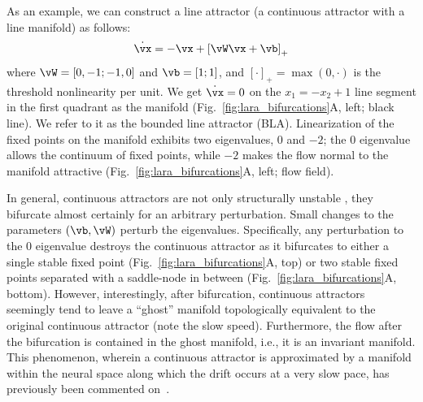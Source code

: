 \documentclass{article} %
\newcounter{ct}
\newcommand{\reals}{\mathbb{R}}
\theoremstyle{definition}
\theoremstyle{remark}
\begin{document}
As an example, we can construct a line attractor (a continuous attractor with a line manifold) as follows:
\begin{align}\label{eq:TLN}
    \dot{\vx} = -\vx + \left[ \vW \vx + \vb \right]_{+}
\end{align}
where \(\vW = [0, -1; -1, 0]\) and \(\vb = [1; 1]\), and \([\cdot]_{+} = \max(0,\cdot)\) is the threshold nonlinearity per unit.
We get \(\dot{\vx} = 0\) on the \(x_1 = -x_2 + 1\) line segment in the first quadrant as the manifold (Fig.~\ref{fig:lara_bifurcations}A, left; black line).
We refer to it as the bounded line attractor (BLA).
Linearization of the fixed points on the manifold exhibits two eigenvalues, \(0\) and \(-2\);
the \(0\) eigenvalue allows the continuum of fixed points, while \(-2\) makes the flow normal to the manifold attractive (Fig.~\ref{fig:lara_bifurcations}A, left; flow field).

In general, continuous attractors are not only structurally unstable \citep{mane1987proof}, they bifurcate almost certainly for an arbitrary perturbation.
Small changes to the parameters \((\vb,\vW)\) perturb the eigenvalues.
Specifically, any perturbation to the \(0\) eigenvalue destroys the continuous attractor as it bifurcates to either
a single stable fixed point (Fig.~\ref{fig:lara_bifurcations}A, top) or two stable fixed points separated with a saddle-node in between (Fig.~\ref{fig:lara_bifurcations}A, bottom).
However, interestingly, after bifurcation, continuous attractors seemingly tend to leave a ``ghost'' manifold topologically equivalent to the original continuous attractor (note the slow speed).
Furthermore, the flow after the bifurcation is contained in the ghost manifold, i.e., it is an invariant manifold.
This phenomenon, wherein a continuous attractor is approximated by a manifold within the neural space along which the drift occurs at a very slow pace, has previously been commented on~\citep{seung1997learning,mante2013context,schmidt2019identifying}.
\end{document}
